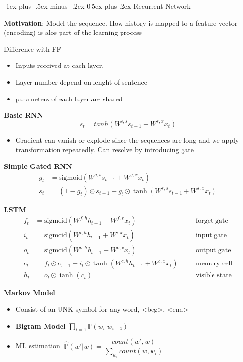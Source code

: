 \documentclass[a4paper, 10pt,landscape]{article}
\makeatletter
\renewcommand{\section}{\@startsection{section}{1}{0mm}%
                                {-1ex plus -.5ex minus -.2ex}%
                                {0.5ex plus .2ex}%
                                {\normalfont\large\bfseries}}
\makeatother
\begin{document}
\begin{multicols*}{3}
\section{Recurrent Network}
\begin{description}
	\item {\bf Motivation}: Model the sequence. How history is mapped to a feature vector (encoding) is alos part of the learning process
	\item {Difference with FF}
		\begin{itemize}
			\item Inputs received at each layer. 
			\item Layer number depend on lenght of sentence
			\item parameters of each layer are shared
		\end{itemize}
	\item {\bf Basic RNN}
		$$s_t  = tanh(W^{s,s}s_{t-1} + W^{s,x}x_t)$$
		\begin{itemize}
			\item Gradient can vanish or explode since the sequences are long and we apply transformation repeatedly. Can resolve by introducing gate
		\end{itemize}
	\item {\bf Simple Gated RNN}
		\begin{align*}
			g_t&=\text{sigmoid}\left(W^{g,s}s_{t-1}+W^{g,x}x_t\right)\\
			s_t&=\left(1-g_t\right)\odot s_{t-1}+g_t\odot\tanh(W^{s,s}s_{t-1}+W^{s,x}x_t)
		\end{align*}
	\item {\bf LSTM}
		\begin{alignat*}{2}
			f_t&=\text{sigmoid}\left(W^{f,h}h_{t-1}+W^{f,x}x_t\right)\quad&&{\text{forget gate}}\\
			i_t&=\text{sigmoid}\left(W^{i,h}h_{t-1}+W^{i,x}x_t\right) &&{\text{input gate}}\\
			o_t&=\text{sigmoid}\left(W^{o,h}h_{t-1}+W^{o,x}x_t\right) &&{\text{output gate}}\\
			c_t&=f_t\odot c_{t-1}+i_t\odot\tanh(W^{c,h}h_{t-1}+W^{c,x}x_t) \quad&&{\text{memory cell}}\\
			h_t&=o_t\odot\tanh(c_t)&&{\text{visible state}}
		\end{alignat*}	
	\item {\bf Markov Model}
		\begin{itemize}
			\item Consist of an UNK symbol for any word, <beg>, <end>
			\item {\bf Bigram Model} $\prod_{i=1} \mathbb{P}(w_i|w_{i-1})$
			\item ML estimation: $\widehat{\mathbb{P}}(w'|w) = \dfrac{count(w', w)}{\sum_{w_i} count(w, w_i)}$
		\end{itemize}
\end{description}




\end{multicols*}
\end{document}
